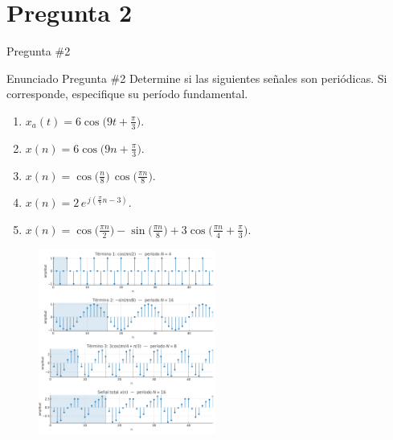\documentclass[
    10pt,
    aspectratio=169,
    xcolor={dvipsnames},
    spanish,
    ]{beamer}
\begin{document}
\section{Pregunta 2}
\begin{frame}{Pregunta \#2}
\begin{block}{Enunciado Pregunta \#2}
Determine si las siguientes señales son periódicas. Si corresponde, especifique su período fundamental.
\begin{enumerate}
  \item \(x_a(t)=6\cos\big(9t+\tfrac{\pi}{3}\big)\).
  \item \(x(n)=6\cos\big(9n+\tfrac{\pi}{3}\big)\).
  \item \(x(n)=\cos\!\big(\tfrac{n}{8}\big)\,\cos\!\big(\tfrac{\pi n}{8}\big)\).
  \item \(x(n)=2\,e^{\,j\left(\tfrac{\pi}{7}n-3\right)}\).
  \item \(x(n)=\cos\!\big(\tfrac{\pi n}{2}\big)-\sin\!\big(\tfrac{\pi n}{8}\big)+3\cos\!\big(\tfrac{\pi n}{4}+\tfrac{\pi}{3}\big)\).
\end{enumerate}
\end{block}
\end{frame}
\begin{frame}
\begin{figure}
  \includegraphics[width=0.52\textwidth]{Auxiliar_1_1.png}
\end{figure}
\end{frame}
\end{document}

